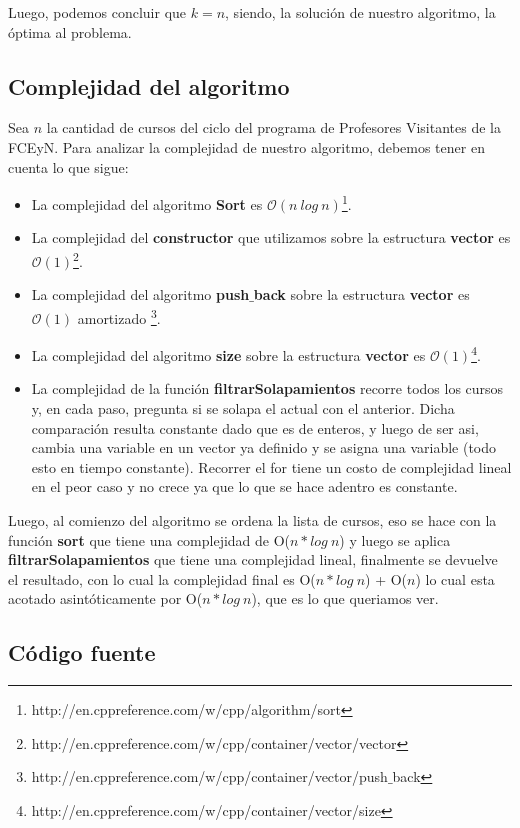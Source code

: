 Luego, podemos concluir que $k = n$, siendo, la solución de nuestro algoritmo, la óptima al problema. 

\subsection{Complejidad del algoritmo}

Sea $n$ la cantidad de cursos del ciclo del programa de Profesores Visitantes de la FCEyN. Para analizar la complejidad de nuestro algoritmo, debemos tener en cuenta lo que sigue:
\begin{itemize}
\item La complejidad del algoritmo \textbf{Sort} es $\mathcal{O}(n\ log\ n)$\footnote{http://en.cppreference.com/w/cpp/algorithm/sort}.
\item La complejidad del \textbf{constructor} que utilizamos sobre la estructura \textbf{vector} es $\mathcal{O}(1)$\footnote{http://en.cppreference.com/w/cpp/container/vector/vector}.
\item La complejidad del algoritmo \textbf{push$\_$back} sobre la estructura \textbf{vector} es $\mathcal{O}(1)$ amortizado \footnote{http://en.cppreference.com/w/cpp/container/vector/push$\_$back}. 
\item La complejidad del algoritmo \textbf{size} sobre la estructura \textbf{vector} es $\mathcal{O}(1)$\footnote{http://en.cppreference.com/w/cpp/container/vector/size}.
\item La complejidad de la función \textbf{filtrarSolapamientos} recorre todos los cursos y, en cada paso, pregunta si se solapa el actual con el anterior. Dicha comparación resulta constante dado que es de enteros, y luego de ser asi, cambia una variable en un vector ya definido y se asigna una variable (todo esto en tiempo constante). Recorrer el for tiene un costo de complejidad lineal en el peor caso y no crece ya que lo que se hace adentro es constante.
\end{itemize}

Luego, al comienzo del algoritmo se ordena la lista de cursos, eso se hace con la función \textbf{sort} que tiene una complejidad de O($n*log\ n$) y luego se aplica \textbf{filtrarSolapamientos} que tiene una complejidad lineal, finalmente se devuelve el resultado, con lo cual la complejidad final es O($n*log\ n$) + O($n$) lo cual esta acotado asintóticamente por O($n*log\ n$), que es lo que queriamos ver.

\subsection{Código fuente}


